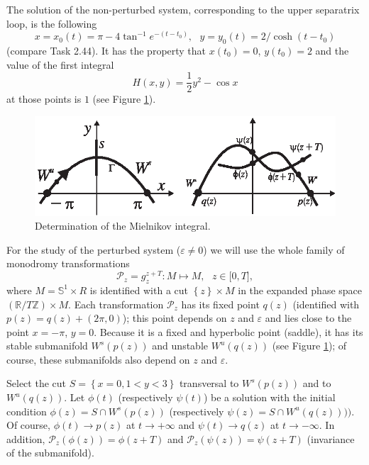 \begin{example}
	The solution of the non-perturbed system, corresponding to the upper separatrix loop, is the following
	\begin{equation}
	\label{5.3}
	x=x_{0}(t)=\pi -4\tan ^{-1}e^{-(t-t_{0})},\text{ \ }y=y_{0}(t)=2/\cosh
	(t-t_{0})
	\end{equation}
	(compare Task 2.44). It has the property that $x(t_{0})=0$, $y(t_{0})=2$ and the value of the first integral
	\begin{equation}
	\label{5.4}
	H(x,y)=\frac{1}{2}y^{2}-\cos x
	\end{equation}
	at those points is $1$ (see Figure \ref{fig:5.6}).
	\begin{figure}[!ht]
		\centering
		\includegraphics [scale=1.4]{jtr56}
		\caption{Determination of the Mielnikov integral.}
		\label{fig:5.6}
	\end{figure}
	
	For the study of the perturbed system ($\varepsilon \not=0$) we will use the whole family of monodromy transformations
	$$
	\mathcal{P}_{z}=g_{z}^{z+T}:M\longmapsto M,\text{ \ \ \ }z\in \lbrack 0,T],
	$$
	where $M=\mathbb{S}^{1}\times R$ is identified with a cut $\left\{ z\right\} \times M$ in the expanded phase space $\left(\mathbb{R} /T\mathbb{Z}\right) \times M$. Each transformation $\mathcal{P}_{z}$ has its fixed point $q(z)$ (identified with $p(z) = q(z) + (2\pi, 0)$); this point depends on $z$ and $\varepsilon$ and lies close to the point $x=-\pi$, $y=0$. Because it is a fixed and hyperbolic point (saddle), it has its stable submanifold $W^{s}(p(z))$ and unstable $W^{u}(q(z))$ (see Figure \ref{fig:5.6}); of course, these submanifolds also depend on $z$ and $\varepsilon$.
	
	Select the cut $S=\left\{ x=0,1<y<3\right\} $ transversal to $W^{s}(p(z))$ and to $W^{u}(q(z))$. Let $\phi (t)$ (respectively $\psi (t)$) be a solution with the initial condition $\phi (z)=S\cap
	W^{s}(p(z))$ (respectively $\psi (z)=S\cap W^{u}(q(z))))$. Of course, $\phi (t)\rightarrow p(z)$ at $t\rightarrow +\infty $ and $\psi
	(t)\rightarrow q(z)$ at $t\rightarrow -\infty$. In addition, $\mathcal{P}%
	_{z}(\phi (z))=\phi (z+T)$ and $\mathcal{P}_{z} (\psi (z)) = \psi (z+T)$ (invariance of the submanifold).	
	

\end{example}
